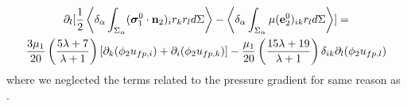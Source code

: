 \begin{multline*}
    \partial_l[\frac{1}{2}\left<\delta_\alpha \int_{\Sigma_\alpha} (\bm{\sigma}_1^0 \cdot \textbf{n}_2)_ir_kr_l d\Sigma\right> -
    \left<\delta_\alpha \int_{\Sigma_\alpha} {\mu(\textbf{e}_2^0)_{ik} r_l} d\Sigma\right> ]
    = \\
    \frac{3 \mu_1 }{20}\left(\frac{5\lambda+7}{\lambda+1}\right)
    [
        \partial_k(\phi_2 u_{fp,i})
        + \partial_i(\phi_2 u_{fp,k})
    ]
    - \frac{\mu_1}{20}\left(\frac{15\lambda+19}{\lambda+1}\right)
    \delta_{ik} \partial_l(\phi_2 u_{fp,l})
\end{multline*}
where we neglected the terms related to the pressure gradient for same reason as \citet{jackson1997locally}. 
